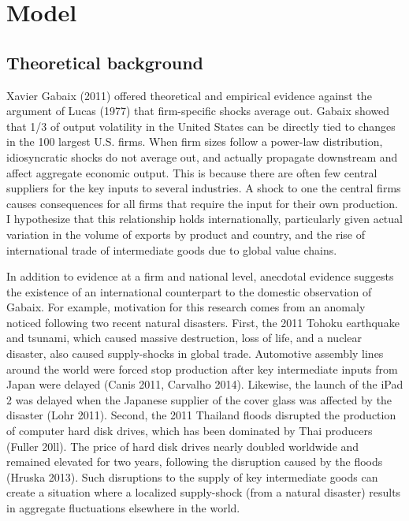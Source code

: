 \documentclass[10pt,letterpaper,pdftex]{article}
\begin{document}
\section{Model}\thispagestyle{emptyheader} \label{models}
\subsection{Theoretical background} \label{modelstheory}
Xavier Gabaix (2011) offered theoretical and empirical evidence against the argument of Lucas (1977) that firm-specific shocks average out. Gabaix showed that 1/3 of output volatility in the United States can be directly tied to changes in the 100 largest U.S. firms. When firm sizes follow a power-law distribution, idiosyncratic shocks do not average out, and actually propagate downstream and affect aggregate economic output. This is because there are often few central suppliers for the key inputs to several industries. A shock to one the central firms causes consequences for all firms that require the input for their own production. I hypothesize that this relationship holds internationally, particularly given actual variation in the volume of exports by product and country, and the rise of international trade of intermediate goods due to global value chains. 

In addition to evidence at a firm and national level, anecdotal evidence suggests the existence of an international counterpart to the domestic observation of Gabaix. For example, motivation for this research comes from an anomaly noticed following two recent natural disasters. First, the 2011 Tohoku earthquake and tsunami, which caused massive destruction, loss of life, and a nuclear disaster, also caused supply-shocks in global trade. Automotive assembly lines around the world were forced stop production after key intermediate inputs from Japan were delayed (Canis 2011, Carvalho 2014). Likewise, the launch of the iPad 2 was delayed when the Japanese supplier of the cover glass was affected by the disaster (Lohr 2011). Second, the 2011 Thailand floods disrupted the production of computer hard disk drives, which has been dominated by Thai producers (Fuller 20ll). The price of hard disk drives nearly doubled worldwide and remained elevated for two years, following the disruption caused by the floods (Hruska 2013). Such disruptions to the supply of key intermediate goods can create a situation where a localized supply-shock (from a natural disaster) results in aggregate fluctuations elsewhere in the world.
\end{document}
